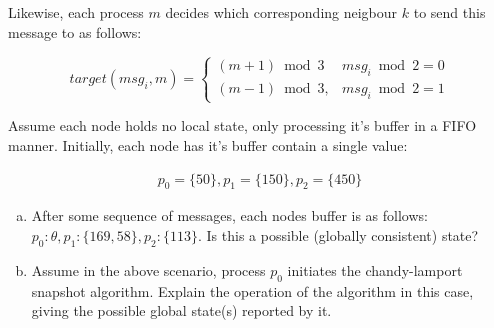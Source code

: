 \documentclass[12pt]{article}
\begin{document}
Likewise, each process $m$ decides which corresponding neigbour $k$ to send this message to as follows:

\[
    target(msg_i, m) = \begin{cases}
        (m + 1) \bmod 3  & msg_i \bmod 2 = 0 \\
        (m - 1) \bmod 3, & msg_i \bmod 2 = 1
    \end{cases}
\]

Assume each node holds no local state, only processing it's buffer in a FIFO manner. Initially, each node has it's buffer contain a single value:

\begin{align*}
    p_0 = \{50\},
    p_1 = \{150\},
    p_2 = \{450\}
\end{align*}

\begin{enumerate}[(a)]
    \item After some sequence of messages, each nodes buffer is as follows: $p_0: \theta,  p_1: \{169,58\}, p_2: \{113\}$. Is this a possible (globally consistent) state?
    \item Assume in the above scenario, process $p_0$ initiates the chandy-lamport snapshot algorithm. Explain the operation of the algorithm in this case, giving the possible global state(s) reported by it.
\end{enumerate}
\end{document}
